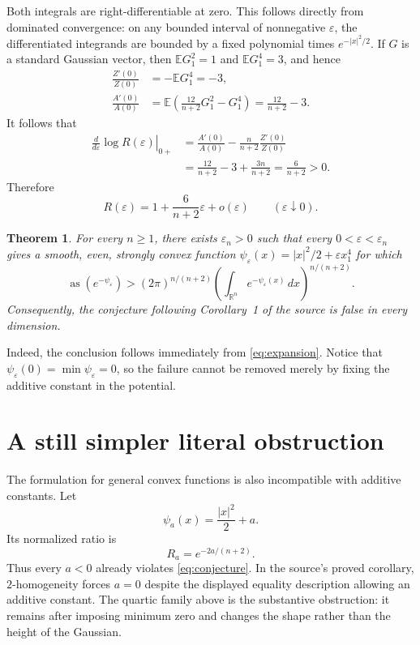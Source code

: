 \documentclass[11pt]{article}
\newtheorem{theorem}{Theorem}
\newcommand{\R}{\mathbb R}
\newcommand{\E}{\mathbb E}
\newcommand{\asa}{\operatorname{as}}
\begin{document}
Both integrals are right-differentiable at zero.  This follows directly from dominated convergence: on any bounded interval of nonnegative $\varepsilon$, the differentiated integrands are bounded by a fixed polynomial times $e^{-|x|^2/2}$.  If $G$ is a standard Gaussian vector, then $\E G_1^2=1$ and $\E G_1^4=3$, and hence
\begin{align*}
 \frac{Z'(0)}{Z(0)}
 &=-\E G_1^4=-3,\\
 \frac{A'(0)}{A(0)}
 &=\E\left(\frac{12}{n+2}G_1^2-G_1^4\right)
 =\frac{12}{n+2}-3.
\end{align*}
It follows that
\begin{align*}
 \left.\frac{d}{d\varepsilon}\log R(\varepsilon)\right|_{0+}
 &=\frac{A'(0)}{A(0)}-\frac{n}{n+2}\frac{Z'(0)}{Z(0)}\\
 &=\frac{12}{n+2}-3+\frac{3n}{n+2}
 =\frac{6}{n+2}>0.
\end{align*}
Therefore
\begin{equation}\label{eq:expansion}
 R(\varepsilon)=1+\frac{6}{n+2}\varepsilon+o(\varepsilon)
 \qquad(\varepsilon\downarrow0).
\end{equation}

\begin{theorem}
For every $n\geq1$, there exists $\varepsilon_n>0$ such that every $0<\varepsilon<\varepsilon_n$ gives a smooth, even, strongly convex function
$\psi_\varepsilon(x)=|x|^2/2+\varepsilon x_1^4$ for which
\[
 \asa(e^{-\psi_\varepsilon})>
 (2\pi)^{n/(n+2)}
 \left(\int_{\R^n}e^{-\psi_\varepsilon(x)}\,dx\right)^{n/(n+2)}.
\]
Consequently, the conjecture following Corollary~1 of the source is false in every dimension.
\end{theorem}

Indeed, the conclusion follows immediately from \eqref{eq:expansion}.  Notice that $\psi_\varepsilon(0)=\min\psi_\varepsilon=0$, so the failure cannot be removed merely by fixing the additive constant in the potential.

\section*{A still simpler literal obstruction}
The formulation for general convex functions is also incompatible with additive constants.  Let
\[
 \psi_a(x)=\frac{|x|^2}{2}+a.
\]
Its normalized ratio is
\[
 R_a=e^{-2a/(n+2)}.
\]
Thus every $a<0$ already violates \eqref{eq:conjecture}.  In the source's proved corollary, $2$-homogeneity forces $a=0$ despite the displayed equality description allowing an additive constant.  The quartic family above is the substantive obstruction: it remains after imposing minimum zero and changes the shape rather than the height of the Gaussian.
\end{document}
